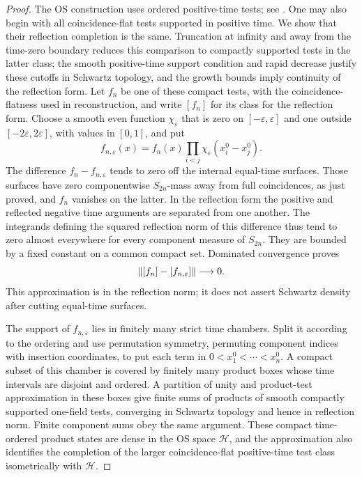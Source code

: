 \begin{proof}
The OS construction uses ordered positive-time tests; see
\cite[Section~V, following Equation~(5.2)]{OS75}.  One may also begin
with all coincidence-flat tests supported in positive time.  We show
that their reflection completion is the same.  Truncation at infinity
and away from the time-zero boundary reduces this comparison to
compactly supported tests in the latter class;
the smooth positive-time support condition and rapid decrease justify
these cutoffs in Schwartz topology, and the growth bounds imply
continuity of the reflection form.  Let $f_n$ be one of these compact
tests, with the coincidence-flatness used in reconstruction, and write
$[f_n]$ for its class for the reflection form.  Choose
a smooth even function $\chi_\varepsilon$ that is zero on
$[-\varepsilon,\varepsilon]$ and one outside
$[-2\varepsilon,2\varepsilon]$, with values in $[0,1]$, and put
\[
 f_{n,\varepsilon}(x)
   =f_n(x)\prod_{i<j}\chi_\varepsilon(x_i^0-x_j^0).
\]
The difference $f_n-f_{n,\varepsilon}$ tends to zero off the internal
equal-time surfaces.  Those surfaces have zero componentwise
$S_{2n}$-mass away from full coincidences, as just proved, and $f_n$
vanishes on the latter.  In the reflection form the positive and
reflected negative time arguments are separated from one another.
The integrands defining the squared reflection norm of this difference
thus tend to zero almost everywhere for every component measure of
$S_{2n}$.  They are bounded by a fixed constant on a common compact
set.  Dominated convergence proves
\[
 \left\lVert[f_n]-[f_{n,\varepsilon}]\right\rVert\longrightarrow0.
\]
This approximation is in the reflection norm; it does not assert
Schwartz density after cutting equal-time surfaces.

The support of $f_{n,\varepsilon}$ lies in finitely many strict time
chambers.  Split it according to the ordering and use permutation
symmetry, permuting component indices with insertion coordinates, to
put each term in $0<x_1^0<\cdots<x_n^0$.  A compact subset
of this chamber is covered by finitely many product boxes whose time
intervals are disjoint and ordered.  A partition of unity and
product-test approximation in these boxes give finite sums of products
of smooth compactly supported one-field tests, converging in Schwartz
topology and hence in reflection norm.  Finite component sums obey the
same argument.  These compact time-ordered product states are dense in
the OS space $\mathcal H$, and the approximation also identifies the
completion of the larger coincidence-flat positive-time test class isometrically with
$\mathcal H$.


\end{proof}
